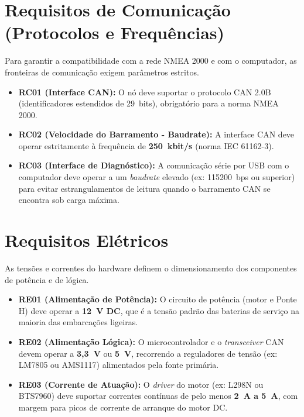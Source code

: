 \section{Requisitos de Comunicação (Protocolos e Frequências)}
Para garantir a compatibilidade com a rede NMEA 2000 e com o computador, as fronteiras de comunicação exigem parâmetros estritos.
\begin{itemize}
    \item \textbf{RC01 (Interface CAN):} O nó deve suportar o protocolo CAN 2.0B (identificadores estendidos de 29~bits), obrigatório para a norma NMEA 2000.
    \item \textbf{RC02 (Velocidade do Barramento - Baudrate):} A interface CAN deve operar estritamente à frequência de \textbf{250~kbit/s} (norma IEC 61162-3).
    \item \textbf{RC03 (Interface de Diagnóstico):} A comunicação série por USB com o computador deve operar a um \textit{baudrate} elevado (ex: 115200~bps ou superior) para evitar estrangulamentos de leitura quando o barramento CAN se encontra sob carga máxima.
\end{itemize}

\section{Requisitos Elétricos}
As tensões e correntes do hardware definem o dimensionamento dos componentes de potência e de lógica.
\begin{itemize}
    \item \textbf{RE01 (Alimentação de Potência):} O circuito de potência (motor e Ponte H) deve operar a \textbf{12~V DC}, que é a tensão padrão das baterias de serviço na maioria das embarcações ligeiras.
    \item \textbf{RE02 (Alimentação Lógica):} O microcontrolador e o \textit{transceiver} CAN devem operar a \textbf{3,3~V} ou \textbf{5~V}, recorrendo a reguladores de tensão (ex: LM7805 ou AMS1117) alimentados pela fonte primária.
    \item \textbf{RE03 (Corrente de Atuação):} O \textit{driver} do motor (ex: L298N ou BTS7960) deve suportar correntes contínuas de pelo menos \textbf{2~A a 5~A}, com margem para picos de corrente de arranque do motor DC.
\end{itemize}

